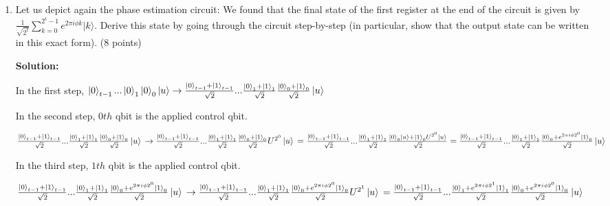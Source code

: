 \documentclass[12pt]{article}
\begin{document}
\begin{enumerate}
    \item Let us depict again the phase estimation circuit: We found that the final state of the first register at the end of the circuit is given by $\frac{1}{\sqrt{2^t}}\sum_{k=0}^{2^t-1} e^{2\pi i\phi k}|k\rangle$. Derive this state by going through the circuit step-by-step (in particular, show that the output state can be written in this exact form). (8 points)

          \textbf{Solution:}

          In the first step, $
              \ket{0}_{t-1}...\ket{0}_1\ket{0}_{0}\ket{u}\rightarrow\frac{\ket{0}_{t-1}+\ket{1}_{t-1}}{\sqrt{2}}...\frac{\ket{0}_1+\ket{1}_1}{\sqrt{2}}\frac{\ket{0}_{0}+\ket{1}_{0}}{\sqrt{2}}\ket{u}
          $

          In the second step, $0th$ qbit is the applied control qbit.

          $
              \frac{\ket{0}_{t-1}+\ket{1}_{t-1}}{\sqrt{2}}...\frac{\ket{0}_1+\ket{1}_1}{\sqrt{2}}\frac{\ket{0}_{0}+\ket{1}_{0}}{\sqrt{2}}\ket{u}
              \\\rightarrow
              \frac{\ket{0}_{t-1}+\ket{1}_{t-1}}{\sqrt{2}}...\frac{\ket{0}_1+\ket{1}_1}{\sqrt{2}}\frac{\ket{0}_{0}+\ket{1}_{0}}{\sqrt{2}}U^{2^0}\ket{u}
              \\=\frac{\ket{0}_{t-1}+\ket{1}_{t-1}}{\sqrt{2}}...\frac{\ket{0}_1+\ket{1}_1}{\sqrt{2}}\frac{\ket{0}_{0}\ket{u}+\ket{1}_{0}U^{2^0}\ket{u}}{\sqrt{2}}
              \\=\frac{\ket{0}_{t-1}+\ket{1}_{t-1}}{\sqrt{2}}...\frac{\ket{0}_1+\ket{1}_1}{\sqrt{2}}\frac{\ket{0}_{0}+e^{2\pi i\phi 2^0}\ket{1}_{0}}{\sqrt{2}}\ket{u}
          $

          In the third step, $1th$ qbit is the applied control qbit.

          $
              \frac{\ket{0}_{t-1}+\ket{1}_{t-1}}{\sqrt{2}}...\frac{\ket{0}_1+\ket{1}_1}{\sqrt{2}}\frac{\ket{0}_{0}+e^{2\pi i\phi 2^0}\ket{1}_{0}}{\sqrt{2}}\ket{u}
              \\\rightarrow
              \frac{\ket{0}_{t-1}+\ket{1}_{t-1}}{\sqrt{2}}...\frac{\ket{0}_1+\ket{1}_1}{\sqrt{2}}\frac{\ket{0}_{0}+e^{2\pi i\phi 2^0}\ket{1}_{0}}{\sqrt{2}}U^{2^1}\ket{u}
              \\=\frac{\ket{0}_{t-1}+\ket{1}_{t-1}}{\sqrt{2}}...\frac{\ket{0}_{1}+e^{2\pi i\phi 2^1}\ket{1}_{1}}{\sqrt{2}}\frac{\ket{0}_{0}+e^{2\pi i\phi 2^0}\ket{1}_{0}}{\sqrt{2}}\ket{u}
          $


\end{enumerate}
\end{document}
